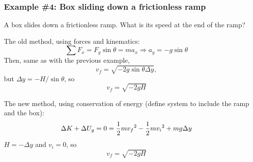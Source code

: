 \subsubsection{Example \#4: Box sliding down a frictionless ramp}
A box slides down a frictionless ramp. What is its speed at the end of the ramp?

The old method, using forces and kinematics:
$$\sum F_x=F_g\sin\theta=ma_x\Rightarrow a_y=-g\sin\theta$$
Then, same as with the previous example,
$$v_f=\sqrt{-2g\sin\theta\Delta{y}},$$
but $\Delta{y}=-H/\sin\theta$, so
$$\boxed{v_f=\sqrt{-2gH}}$$

The new method, using conservation of energy (define system to include the ramp and the box):
$$\Delta K+\Delta U_g=0=\frac{1}{2}mv_f\displaystyle^2-\frac{1}{2}mv_i\displaystyle^2+mg\Delta{y}$$
$H=-\Delta{y}$ and $v_i=0$, so
$$\boxed{v_f=\sqrt{-2gH}}$$

\clearpage
